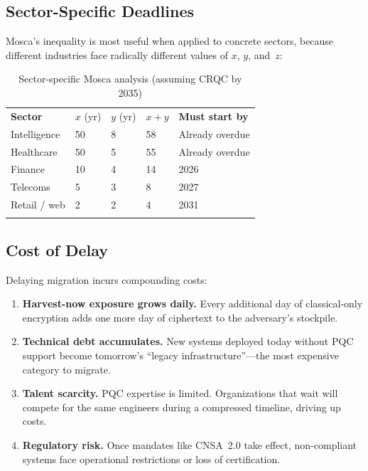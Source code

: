 \subsection{Sector-Specific Deadlines}
\label{subsec:sector-deadlines}

Mosca's inequality is most useful when applied to concrete sectors, because different industries face radically different values of $x$, $y$, and~$z$:

\begin{table}[t]
\caption{Sector-specific Mosca analysis (assuming CRQC by 2035)}
\label{tab:sector-mosca}
\begin{tabular}{p{3cm}p{1.5cm}p{1.5cm}p{1.5cm}p{3.5cm}}
\hline\noalign{\smallskip}
\textbf{Sector} & $x$ (yr) & $y$ (yr) & $x+y$ & \textbf{Must start by} \\
\noalign{\smallskip}\svhline\noalign{\smallskip}
Intelligence & 50 & 8 & 58 & Already overdue \\
Healthcare & 50 & 5 & 55 & Already overdue \\
Finance & 10 & 4 & 14 & 2026 \\
Telecoms & 5 & 3 & 8 & 2027 \\
Retail / web & 2 & 2 & 4 & 2031 \\
\noalign{\smallskip}\hline
\end{tabular}
\end{table}

\subsection{Cost of Delay}
\label{subsec:cost-delay}

Delaying migration incurs compounding costs:
\begin{enumerate}
\item \textbf{Harvest-now exposure grows daily.}  Every additional day of classical-only encryption adds one more day of ciphertext to the adversary's stockpile.
\item \textbf{Technical debt accumulates.}  New systems deployed today without PQC support become tomorrow's ``legacy infrastructure''---the most expensive category to migrate.
\item \textbf{Talent scarcity.}  PQC expertise is limited.  Organizations that wait will compete for the same engineers during a compressed timeline, driving up costs.
\item \textbf{Regulatory risk.}  Once mandates like CNSA~2.0 take effect, non-compliant systems face operational restrictions or loss of certification.
\end{enumerate}

